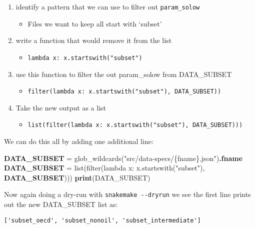 \documentclass[]{book}
\newenvironment{Shaded}{\begin{snugshade}}{\end{snugshade}}
\newcommand{\KeywordTok}[1]{\textcolor[rgb]{0.13,0.29,0.53}{\textbf{{#1}}}}
\newcommand{\StringTok}[1]{\textcolor[rgb]{0.31,0.60,0.02}{{#1}}}
\newcommand{\NormalTok}[1]{{#1}}
\providecommand{\tightlist}{%
  \setlength{\itemsep}{0pt}\setlength{\parskip}{0pt}}
\theoremstyle{definition}
\theoremstyle{definition}
\theoremstyle{definition}
\theoremstyle{remark}
\begin{document}
\begin{enumerate}
\def\labelenumi{\arabic{enumi}.}
\tightlist
\item
  identify a pattern that we can use to filter out \texttt{param\_solow}

  \begin{itemize}
  \tightlist
  \item
    Files we want to keep all start with `subset'
  \end{itemize}
\item
  write a function that would remove it from the list

  \begin{itemize}
  \tightlist
  \item
    \texttt{lambda\ x:\ x.startswith("subset")}
  \end{itemize}
\item
  use this function to filter the out param\_solow from DATA\_SUBSET

  \begin{itemize}
  \tightlist
  \item
    \texttt{filter(lambda\ x:\ x.startswith("subset"),\ DATA\_SUBSET))}
  \end{itemize}
\item
  Take the new output as a list

  \begin{itemize}
  \tightlist
  \item
    \texttt{list(filter(lambda\ x:\ x.startswith("subset"),\ DATA\_SUBSET)))}
  \end{itemize}
\end{enumerate}

We can do this all by adding one additional line:

\begin{Shaded}
\begin{Highlighting}[]
\KeywordTok{DATA_SUBSET} \NormalTok{= glob_wildcards(}\StringTok{"src/data-specs/\{fname\}.json"}\NormalTok{)}\KeywordTok{.fname}
\KeywordTok{DATA_SUBSET} \NormalTok{= list(filter(lambda x: x.startswith(}\StringTok{"subset"}\NormalTok{), }\KeywordTok{DATA_SUBSET}\NormalTok{)))}
\KeywordTok{print}\NormalTok{(DATA_SUBSET)}
\end{Highlighting}
\end{Shaded}

Now again doing a dry-run with \texttt{snakemake\ -\/-dryrun} we see the
first line prints out the new DATA\_SUBSET list as:

\begin{verbatim}
['subset_oecd', 'subset_nonoil', 'subset_intermediate']
\end{verbatim}
\end{document}
